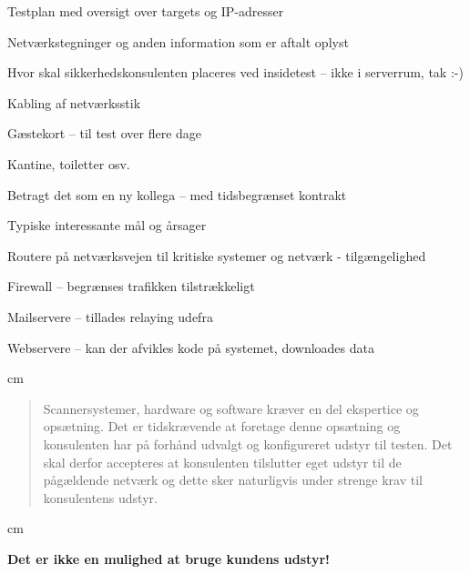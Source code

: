 \documentclass[20pt,landscape,a4paper,footrule]{foils}
\begin{document}

\begin{list1}
\item Testplan med oversigt over targets og IP-adresser
\item Netværkstegninger og anden information som er aftalt oplyst
\item Hvor skal sikkerhedskonsulenten placeres ved insidetest -- ikke i serverrum, tak :-)
\item Kabling af netværksstik
\item Gæstekort -- til test over flere dage
\item Kantine, toiletter osv.
\end{list1}
\vskip 1cm
\centerline{Betragt det som en ny kollega -- med tidsbegrænset kontrakt}



\begin{list1}
\item Typiske interessante mål og årsager
\begin{list2}
\item Routere på netværksvejen til kritiske systemer og netværk -
  tilgængelighed
\item Firewall -- begrænses trafikken tilstrækkeligt
\item Mailservere -- tillades relaying udefra
\item Webservere -- kan der afvikles kode på systemet, downloades data
\end{list2}
\end{list1}



 cm
\begin{quote}
Scannersystemer, hardware og software kræver en del ekspertice og
opsætning. Det er tidskrævende at foretage denne opsætning og
konsulenten har på forhånd udvalgt og konfigureret udstyr til testen.
Det skal derfor accepteres at konsulenten tilslutter eget udstyr til
de pågældende netværk og dette sker naturligvis under strenge krav til
konsulentens udstyr.
\end{quote}
 cm
\centerline{\bf Det er ikke en mulighed at bruge kundens udstyr!}

\end{document}
